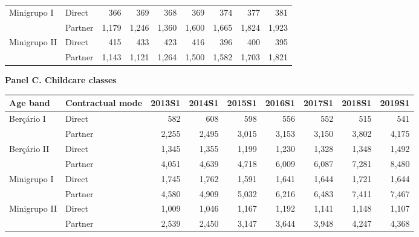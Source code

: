 \begin{table}[htbp]
\begin{tabular}{llrrrrrrr}
Minigrupo I & Direct & 366 & 369 & 368 & 369 & 374 & 377 & 381 \\
 & Partner & 1,179 & 1,246 & 1,360 & 1,600 & 1,665 & 1,824 & 1,923 \\
Minigrupo II & Direct & 415 & 433 & 423 & 416 & 396 & 400 & 395 \\
 & Partner & 1,143 & 1,121 & 1,264 & 1,500 & 1,582 & 1,703 & 1,821 \\
\end{tabular}
\par\medskip\textbf{Panel C. Childcare classes}\par\smallskip
\begin{tabular}{llrrrrrrr}
Age band & Contractual mode & 2013S1 & 2014S1 & 2015S1 & 2016S1 & 2017S1 & 2018S1 & 2019S1 \\
\midrule
Ber\c{c}\'ario I & Direct & 582 & 608 & 598 & 556 & 552 & 515 & 541 \\
 & Partner & 2,255 & 2,495 & 3,015 & 3,153 & 3,150 & 3,802 & 4,175 \\
Ber\c{c}\'ario II & Direct & 1,345 & 1,355 & 1,199 & 1,230 & 1,328 & 1,348 & 1,492 \\
 & Partner & 4,051 & 4,639 & 4,718 & 6,009 & 6,087 & 7,281 & 8,480 \\
Minigrupo I & Direct & 1,745 & 1,762 & 1,591 & 1,641 & 1,644 & 1,721 & 1,644 \\
 & Partner & 4,580 & 4,909 & 5,032 & 6,216 & 6,483 & 7,411 & 7,467 \\
Minigrupo II & Direct & 1,009 & 1,046 & 1,167 & 1,192 & 1,141 & 1,148 & 1,107 \\
 & Partner & 2,539 & 2,450 & 3,147 & 3,644 & 3,948 & 4,247 & 4,368 \\
\bottomrule
\end{tabular}
\end{table}
